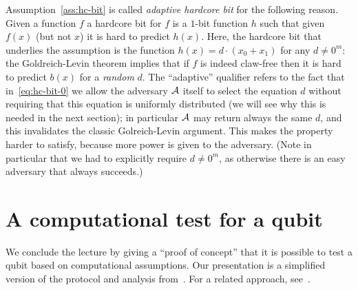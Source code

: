 \begin{remark}
Assumption~\ref{ass:hc-bit} is called \emph{adaptive hardcore bit} for the following reason. Given a function $f$ a hardcore bit for $f$ is a $1$-bit function $h$ such that given $f(x)$ (but not $x$) it is hard to predict $h(x)$. Here, the hardcore bit that underlies the assumption is the function $h(x)=d\cdot (x_0+x_1)$ for any $d\neq 0^m$: the Goldreich-Levin theorem implies that if $f$ is indeed claw-free then it is hard to predict $b(x)$ for a \emph{random} $d$. The ``adaptive'' qualifier refers to the fact that in~\eqref{eq:hc-bit-0} we allow the adversary $\mathcal{A}$ itself to select the equation $d$ without requiring that this equation is uniformly distributed  (we will see why this is needed in the next section); in particular $\mathcal{A}$ may return always the same $d$, and this invalidates the classic Golreich-Levin argument. This makes the property harder to satisfy, because more power is given to the adversary. (Note in particular that we had to explicitly require $d\neq 0^m$, as otherwise there is an easy adversary that always succeeds.)
\end{remark}

\section{A computational test for a qubit}
\label{sec:comp-test}

We conclude the lecture by giving a ``proof of concept'' that it is possible to test a qubit based on computational assumptions. Our presentation is a simplified version of the protocol and analysis from~\cite{brakerski2018cryptographic}. For a related approach, see~\cite{cojocaru2019qfactory}. 

